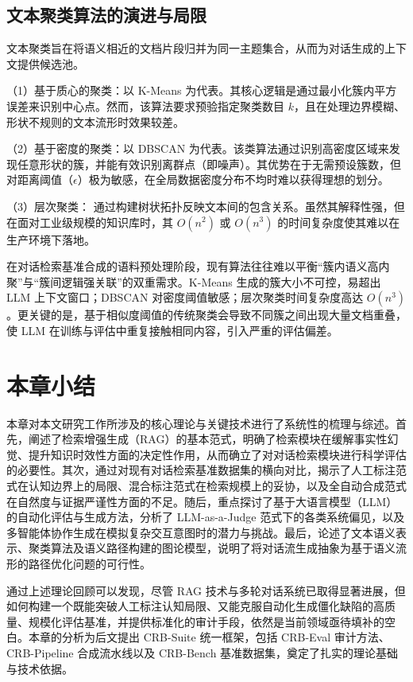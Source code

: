 \subsection{文本聚类算法的演进与局限}

文本聚类旨在将语义相近的文档片段归并为同一主题集合，从而为对话生成的上下文提供候选池。

（1）基于质心的聚类：以 K-Means 为代表。其核心逻辑是通过最小化簇内平方误差来识别中心点。然而，该算法要求预验指定聚类数目 $k$，且在处理边界模糊、形状不规则的文本流形时效果较差。

（2）基于密度的聚类：以 DBSCAN 为代表。该类算法通过识别高密度区域来发现任意形状的簇，并能有效识别离群点（即噪声）。其优势在于无需预设簇数，但对距离阈值（$\epsilon$）极为敏感，在全局数据密度分布不均时难以获得理想的划分。

（3）层次聚类： 通过构建树状拓扑反映文本间的包含关系。虽然其解释性强，但在面对工业级规模的知识库时，其 $O(n^2)$ 或 $O(n^3)$ 的时间复杂度使其难以在生产环境下落地。

在对话检索基准合成的语料预处理阶段，现有算法往往难以平衡“簇内语义高内聚”与“簇间逻辑强关联”的双重需求。K-Means 生成的簇大小不可控，易超出 LLM 上下文窗口；DBSCAN 对密度阈值敏感；层次聚类时间复杂度高达 $O(n^3)$。更关键的是，基于相似度阈值的传统聚类会导致不同簇之间出现大量文档重叠，使 LLM 在训练与评估中重复接触相同内容，引入严重的评估偏差。



\section{本章小结}

本章对本文研究工作所涉及的核心理论与关键技术进行了系统性的梳理与综述。首先，阐述了检索增强生成（RAG）的基本范式，明确了检索模块在缓解事实性幻觉、提升知识时效性方面的决定性作用，从而确立了对对话检索模块进行科学评估的必要性。其次，通过对现有对话检索基准数据集的横向对比，揭示了人工标注范式在认知边界上的局限、混合标注范式在检索规模上的妥协，以及全自动合成范式在自然度与证据严谨性方面的不足。随后，重点探讨了基于大语言模型（LLM）的自动化评估与生成方法，分析了 LLM-as-a-Judge 范式下的各类系统偏见，以及多智能体协作生成在模拟复杂交互意图时的潜力与挑战。最后，论述了文本语义表示、聚类算法及语义路径构建的图论模型，说明了将对话流生成抽象为基于语义流形的路径优化问题的可行性。

通过上述理论回顾可以发现，尽管 RAG 技术与多轮对话系统已取得显著进展，但如何构建一个既能突破人工标注认知局限、又能克服自动化生成僵化缺陷的高质量、规模化评估基准，并提供标准化的审计手段，依然是当前领域亟待填补的空白。本章的分析为后文提出 CRB-Suite 统一框架，包括 CRB-Eval 审计方法、CRB-Pipeline 合成流水线以及 CRB-Bench 基准数据集，奠定了扎实的理论基础与技术依据。

